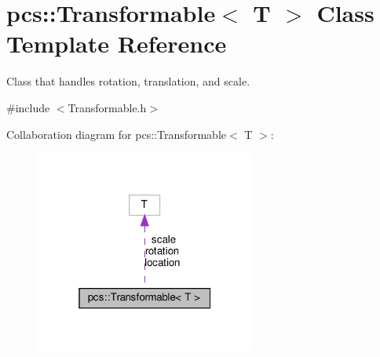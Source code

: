 \hypertarget{classpcs_1_1Transformable}{}\section{pcs\+:\+:Transformable$<$ T $>$ Class Template Reference}
\label{classpcs_1_1Transformable}


Class that handles rotation, translation, and scale.  




{\ttfamily \#include $<$Transformable.\+h$>$}



Collaboration diagram for pcs\+:\+:Transformable$<$ T $>$\+:\nopagebreak
\begin{figure}[H]
\begin{center}
\leavevmode
\includegraphics[width=205pt]{classpcs_1_1Transformable__coll__graph}
\end{center}
\end{figure}
